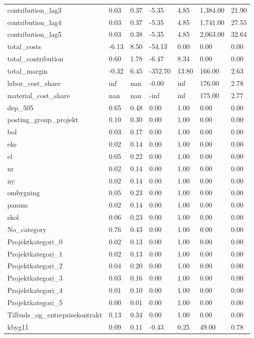 \begin{landscape}
\begin{longtable}[h!]{lllllll}
contribution_lag3 & 0.03 & 0.37 & -5.35 & 4.85 & 1,384.00 & 21.90 \\
contribution_lag4 & 0.03 & 0.37 & -5.35 & 4.85 & 1,741.00 & 27.55 \\
contribution_lag5 & 0.03 & 0.38 & -5.35 & 4.85 & 2,063.00 & 32.64 \\
total_costs & -6.13 & 8.50 & -54.13 & 0.00 & 0.00 & 0.00 \\
total_contribution & 0.60 & 1.78 & -6.47 & 8.34 & 0.00 & 0.00 \\
total_margin & -0.32 & 6.45 & -352.70 & 13.80 & 166.00 & 2.63 \\
labor_cost_share & inf & nan & -0.00 & inf & 176.00 & 2.78 \\
material_cost_share & nan & nan & -inf & inf & 175.00 & 2.77 \\
dep_505 & 0.65 & 0.48 & 0.00 & 1.00 & 0.00 & 0.00 \\
posting_group_projekt & 0.10 & 0.30 & 0.00 & 1.00 & 0.00 & 0.00 \\
bol & 0.03 & 0.17 & 0.00 & 1.00 & 0.00 & 0.00 \\
eks & 0.02 & 0.14 & 0.00 & 1.00 & 0.00 & 0.00 \\
el & 0.05 & 0.22 & 0.00 & 1.00 & 0.00 & 0.00 \\
nr & 0.02 & 0.14 & 0.00 & 1.00 & 0.00 & 0.00 \\
ny & 0.02 & 0.14 & 0.00 & 1.00 & 0.00 & 0.00 \\
ombygning & 0.05 & 0.23 & 0.00 & 1.00 & 0.00 & 0.00 \\
panum & 0.02 & 0.14 & 0.00 & 1.00 & 0.00 & 0.00 \\
skol & 0.06 & 0.23 & 0.00 & 1.00 & 0.00 & 0.00 \\
No_category & 0.76 & 0.43 & 0.00 & 1.00 & 0.00 & 0.00 \\
Projektkategori_0 & 0.02 & 0.13 & 0.00 & 1.00 & 0.00 & 0.00 \\
Projektkategori_1 & 0.02 & 0.13 & 0.00 & 1.00 & 0.00 & 0.00 \\
Projektkategori_2 & 0.04 & 0.20 & 0.00 & 1.00 & 0.00 & 0.00 \\
Projektkategori_3 & 0.03 & 0.16 & 0.00 & 1.00 & 0.00 & 0.00 \\
Projektkategori_4 & 0.01 & 0.10 & 0.00 & 1.00 & 0.00 & 0.00 \\
Projektkategori_5 & 0.00 & 0.01 & 0.00 & 1.00 & 0.00 & 0.00 \\
Tilbuds_og_entreprisekontrakt & 0.13 & 0.34 & 0.00 & 1.00 & 0.00 & 0.00 \\
kbyg11 & 0.09 & 0.11 & -0.43 & 0.25 & 49.00 & 0.78 \\

\end{longtable}
\end{landscape}
